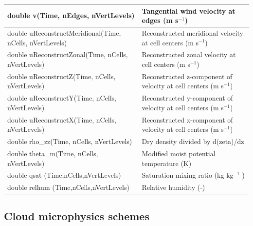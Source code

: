 \documentclass[11pt]{report}
\begin{document}
{\small        
\begin{longtable}{|p{2.5in} |p{3.75in}|}
 \hline
        double v(Time, nEdges, nVertLevels)          &        Tangential wind velocity at edges (m s$^{-1}$)  \\ \hline 
        double uReconstructMeridional\hfil\break (Time, nCells, nVertLevels)  & Reconstructed meridional velocity at cell centers (m s$^{-1}$)  \\ \hline
        double uReconstructZonal\hfil\break (Time, nCells, nVertLevels)  &      Reconstructed zonal velocity at cell centers \hfil\break (m s$^{-1}$) \\ \hline
        double uReconstructZ\hfil\break (Time, nCells, nVertLevels)      &      Reconstructed z-component of velocity at cell centers \hfil\break (m s$^{-1}$) \\ \hline
        double uReconstructY\hfil\break (Time, nCells, nVertLevels)      &      Reconstructed y-component of velocity at cell centers \hfil\break (m s$^{-1}$) \\ \hline
        double uReconstructX\hfil\break (Time, nCells, nVertLevels)      &      Reconstructed x-component of velocity at cell centers \hfil\break (m s$^{-1}$)  \\ \hline
        double \hfil\break rho\_zz(Time, nCells, nVertLevels)   &  Dry density divided by d(zeta)/dz \\ \hline
        double \hfil\break theta\_m(Time, nCells, nVertLevels)  &  Modified moist potential temperature (K) \\ \hline
        double qsat \hfill\break(Time,nCells,nVertLevels) & Saturation mixing ratio  (kg kg$^{-1}$ ) \\ \hline
        double relhum \hfill\break(Time,nCells,nVertLevels) & Relative humidity (-) \\ \hline
\end{longtable}
}


\subsection{Cloud microphysics schemes}
\end{document}
